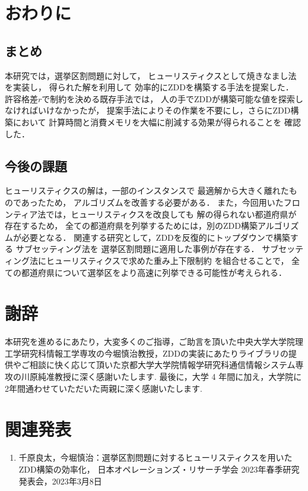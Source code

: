 \documentclass[10pt,a4paper,notitlepage,oneside,twocolumn]{abst_jsarticle}
\begin{document}
\section{おわりに}
\subsection{まとめ}
本研究では，選挙区割問題に対して，
ヒューリスティクスとして焼きなまし法を実装し，
得られた解を利用して
効率的にZDDを構築する手法を提案した．
許容格差$r$で制約を決める既存手法では，
人の手でZDDが構築可能な値を探索しなければいけなかったが，
提案手法によりその作業を不要にし，さらにZDD構築において
計算時間と消費メモリを大幅に削減する効果が得られることを
確認した．

\subsection{今後の課題}
ヒューリスティクスの解は，一部のインスタンスで
最適解から大きく離れたものであったため，
アルゴリズムを改善する必要がある．
また，今回用いたフロンティア法では，ヒューリスティクスを改良しても
解の得られない都道府県が存在するため，
全ての都道府県を列挙するためには，別のZDD構築アルゴリズムが必要となる．
関連する研究として，ZDDを反復的にトップダウンで構築する
サブセッティング法を
選挙区割問題に適用した事例\cite{yamazaki}が存在する．
サブセッティング法にヒューリスティクスで求めた重み上下限制約
を組合せることで，
全ての都道府県について選挙区をより高速に列挙できる可能性が考えられる．

\section*{謝辞}
本研究を進めるにあたり，大変多くのご指導，ご助言を頂いた中央大学大学院理工学研究科情報工学専攻の今堀慎治教授，ZDDの実装にあたりライブラリの提供やご相談に快く応じて頂いた京都大学大学院情報学研究科通信情報システム専攻の川原純准教授に深く感謝いたします.
最後に，大学 4 年間に加え，大学院に2年間通わせていただいた両親に深く感謝いたします.

\section*{関連発表}
\begin{enumerate}
  \item 千原良太，今堀慎治：選挙区割問題に対するヒューリスティクスを用いたZDD構築の効率化，
  日本オペレーションズ・リサーチ学会 2023年春季研究発表会，2023年3月8日
\end{enumerate}
\end{document}
